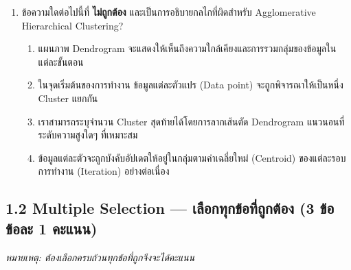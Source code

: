 \documentclass[a4paper,12pt]{article}
\begin{document}
\begin{enumerate}[label=\textbf{\arabic*.}]
\item ข้อความใดต่อไปนี้ที่ \textbf{ไม่ถูกต้อง} และเป็นการอธิบายกลไกที่ผิดสำหรับ Agglomerative Hierarchical Clustering?
\begin{enumerate}[label=\alph*.]
    \item แผนภาพ Dendrogram จะแสดงให้เห็นถึงความใกล้เคียงและการรวมกลุ่มของข้อมูลในแต่ละขั้นตอน
    \item ในจุดเริ่มต้นของการทำงาน ข้อมูลแต่ละตัวแปร (Data point) จะถูกพิจารณาให้เป็นหนึ่ง Cluster แยกกัน
    \item เราสามารถระบุจำนวน Cluster สุดท้ายได้โดยการลากเส้นตัด Dendrogram แนวนอนที่ระดับความสูงใดๆ ที่เหมาะสม
    \item ข้อมูลแต่ละตัวจะถูกบังคับอัปเดตให้อยู่ในกลุ่มตามค่าเฉลี่ยใหม่ (Centroid) ของแต่ละรอบการทำงาน (Iteration) อย่างต่อเนื่อง
\end{enumerate}

\end{enumerate}

\subsection*{1.2 Multiple Selection — เลือกทุกข้อที่ถูกต้อง (3 ข้อ ข้อละ 1 คะแนน)}
\textit{หมายเหตุ: ต้องเลือกครบถ้วนทุกข้อที่ถูกจึงจะได้คะแนน}
\end{document}
